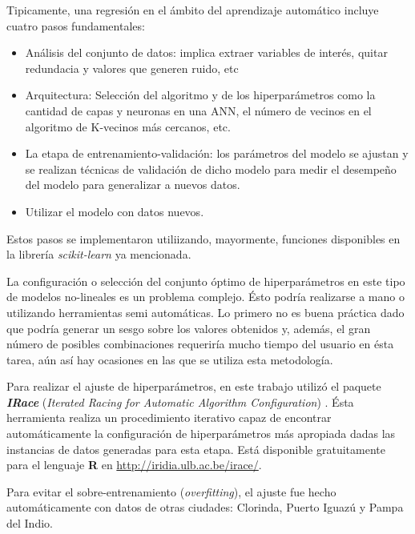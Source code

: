     \par Tipicamente, una regresión en el ámbito del aprendizaje automático
      incluye cuatro pasos fundamentales:
      \begin{itemize}
        \item Análisis del conjunto de datos: implica extraer variables de interés, quitar redundacia y valores que generen
              ruido, etc
        \item Arquitectura: Selección del algoritmo y de los hiperparámetros como
              la cantidad de capas y neuronas en una ANN, el número de vecinos en
              el algoritmo de K-vecinos más cercanos, etc.
        \item La etapa de entrenamiento-validación: los parámetros del modelo
              se ajustan y se realizan técnicas de validación de dicho modelo para
              medir el desempeño del modelo para generalizar a nuevos datos.
        \item Utilizar el modelo con datos nuevos.
      \end{itemize}
      Estos pasos se implementaron utiliizando, mayormente, funciones disponibles
      en la librería \textit{scikit-learn} ya mencionada.

    \par La configuración o selección del conjunto óptimo de hiperparámetros
      en este tipo de modelos no-lineales es un problema complejo. Ésto
      podría realizarse a mano o utilizando herramientas semi automáticas. Lo primero
      no es buena práctica dado que podría generar un sesgo sobre los valores
      obtenidos y, además, el gran número de posibles combinaciones requeriría
      mucho tiempo del usuario en ésta tarea, aún así hay ocasiones en las
      que se utiliza esta metodología.

    \par Para realizar el ajuste de hiperparámetros, en este trabajo
      utilizó el paquete \textbf{\textit{IRace}}
      (\textit{Iterated Racing for Automatic Algorithm Configuration}) \cite{irace}.
      Ésta herramienta realiza un procedimiento iterativo capaz de encontrar
      automáticamente la configuración de hiperparámetros más apropiada
      dadas las instancias de datos generadas para esta etapa.
      Está disponible gratuitamente para el lenguaje \textbf{R} en
      \url{http://iridia.ulb.ac.be/irace/}.

    \par Para evitar el sobre-entrenamiento (\textit{overfitting}), el ajuste
      fue hecho automáticamente con datos de otras ciudades: Clorinda, Puerto Iguazú
      y Pampa del Indio.


